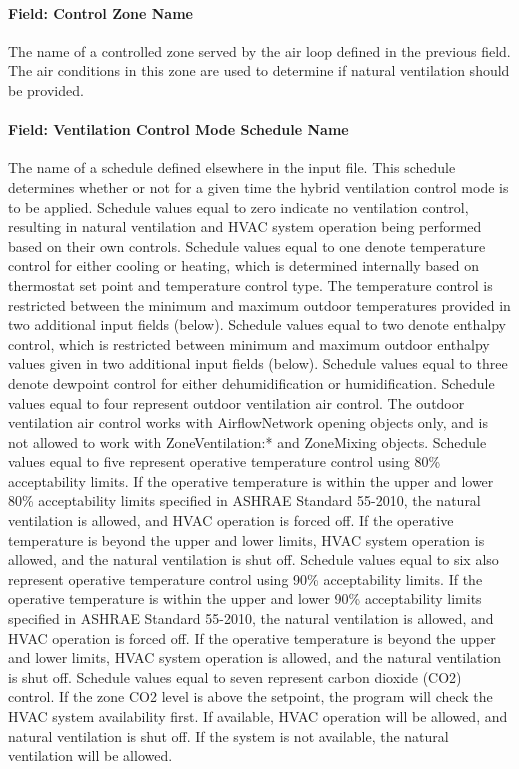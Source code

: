 \paragraph{Field: Control Zone Name}\label{field-controlled-zone-name}

The name of a controlled zone served by the air loop defined in the previous field. The air conditions in this zone are used to determine if natural ventilation should be provided.

\paragraph{Field: Ventilation Control Mode Schedule Name}\label{field-ventilation-control-mode-schedule-name}

The name of a schedule defined elsewhere in the input file. This schedule determines whether or not for a given time the hybrid ventilation control mode is to be applied. Schedule values equal to zero indicate no ventilation control, resulting in natural ventilation and HVAC system operation being performed based on their own controls. Schedule values equal to one denote temperature control for either cooling or heating, which is determined internally based on thermostat set point and temperature control type. The temperature control is restricted between the minimum and maximum outdoor temperatures provided in two additional input fields (below). Schedule values equal to two denote enthalpy control, which is restricted between minimum and maximum outdoor enthalpy values given in two additional input fields (below). Schedule values equal to three denote dewpoint control for either dehumidification or humidification. Schedule values equal to four represent outdoor ventilation air control. The outdoor ventilation air control works with AirflowNetwork opening objects only, and is not allowed to work with ZoneVentilation:* and ZoneMixing objects. Schedule values equal to five represent operative temperature control using 80\% acceptability limits. If the operative temperature is within the upper and lower 80\% acceptability limits specified in ASHRAE Standard 55-2010, the natural ventilation is allowed, and HVAC operation is forced off. If the operative temperature is beyond the upper and lower limits, HVAC system operation is allowed, and the natural ventilation is shut off. Schedule values equal to six also represent operative temperature control using 90\% acceptability limits. If the operative temperature is within the upper and lower 90\% acceptability limits specified in ASHRAE Standard 55-2010, the natural ventilation is allowed, and HVAC operation is forced off. If the operative temperature is beyond the upper and lower limits, HVAC system operation is allowed, and the natural ventilation is shut off. Schedule values equal to seven represent carbon dioxide (CO2) control. If the zone CO2 level is above the setpoint, the program will check the HVAC system availability first. If available, HVAC operation will be allowed, and natural ventilation is shut off. If the system is not available, the natural ventilation will be allowed.

